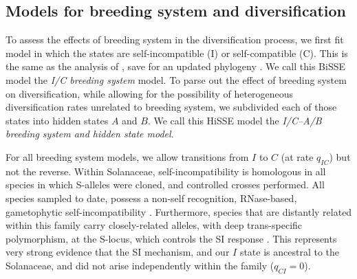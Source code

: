 \subsection{Models for breeding system and diversification}

To assess the effects of breeding system in the diversification process, we first fit model in which the states are self-incompatible (I) or self-compatible (C).
This is the same as the analysis of \citet{goldberg_2010}, save for an updated phylogeny \citep{sarkinen_2013}.
We call this BiSSE model the \textit{I/C breeding system} model. 
To parse out the effect of breeding system on diversification, while allowing for the possibility of heterogeneous diversification rates unrelated to breeding system, we subdivided each of those states into hidden states $A$ and $B$.
We call this HiSSE model the \textit{I/C--A/B breeding system and hidden state model}. 

For all breeding system models, we allow transitions from $I$ to $C$ (at rate $q_{IC}$) but not the reverse. %
Within Solanaceae, self-incompatibility is homologous in all species in which S-alleles were cloned, and controlled crosses performed.  
All species sampled to date, possess a non-self recognition, RNase-based, gametophytic self-incompatibility \citep[shared even shared even with other euasterid families;][]{ramanauskas_2017}. %
Furthermore, species that are distantly related within this family carry closely-related alleles, with deep trans-specific polymorphism, at the S-locus, which controls the SI response \citep{ioerger_1990, igic_2006}. %
This represents very strong evidence that the SI mechanism, and our $I$ state is ancestral to the Solanaceae, and did not arise independently within the family ($q_{CI}=0$). %

